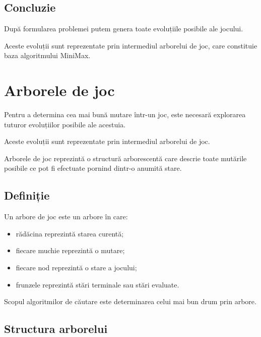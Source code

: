 \documentclass[12pt,a4paper]{article}
\begin{document}
\subsection{Concluzie}

După formularea problemei putem genera toate evoluțiile posibile ale jocului.

Aceste evoluții sunt reprezentate prin intermediul arborelui de joc, care constituie baza algoritmului MiniMax.















\section{Arborele de joc}

Pentru a determina cea mai bună mutare într-un joc, este necesară explorarea tuturor evoluțiilor posibile ale acestuia.

Aceste evoluții sunt reprezentate prin intermediul arborelui de joc.

Arborele de joc reprezintă o structură arborescentă care descrie toate mutările posibile ce pot fi efectuate pornind dintr-o anumită stare.

\subsection{Definiție}

Un arbore de joc este un arbore în care:

\begin{itemize}
\item rădăcina reprezintă starea curentă;
\item fiecare muchie reprezintă o mutare;
\item fiecare nod reprezintă o stare a jocului;
\item frunzele reprezintă stări terminale sau stări evaluate.
\end{itemize}

Scopul algoritmilor de căutare este determinarea celui mai bun drum prin arbore.

\subsection{Structura arborelui}
\end{document}
